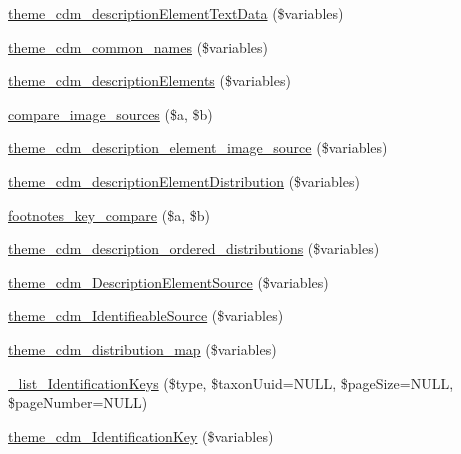 \begin{DoxyCompactItemize}
\item 
\hyperlink{cdm__dataportal_8descriptions_8theme_ac8dc91fcb4c8f1ba4503dae8034fc45e}{theme\-\_\-cdm\-\_\-description\-Element\-Text\-Data} (\$variables)
\item 
\hyperlink{cdm__dataportal_8descriptions_8theme_afee4cb1a5526e2af54aed8a9ebd41d41}{theme\-\_\-cdm\-\_\-common\-\_\-names} (\$variables)
\item 
\hyperlink{cdm__dataportal_8descriptions_8theme_afd1fddb74fcfe3ddff7928fbfa182dab}{theme\-\_\-cdm\-\_\-description\-Elements} (\$variables)
\item 
\hyperlink{cdm__dataportal_8descriptions_8theme_a240e3e12531ae51f9ccd831655d5df98}{compare\-\_\-image\-\_\-sources} (\$a, \$b)
\item 
\hyperlink{cdm__dataportal_8descriptions_8theme_a9ddae3b1d9be31f9245228d67fe4a56f}{theme\-\_\-cdm\-\_\-description\-\_\-element\-\_\-image\-\_\-source} (\$variables)
\item 
\hyperlink{cdm__dataportal_8descriptions_8theme_a2c76ce798eb769d6a41f0eff22d1aa35}{theme\-\_\-cdm\-\_\-description\-Element\-Distribution} (\$variables)
\item 
\hyperlink{cdm__dataportal_8descriptions_8theme_a73b951aa99c676f2e374c2606b9458cb}{footnotes\-\_\-key\-\_\-compare} (\$a, \$b)
\item 
\hyperlink{cdm__dataportal_8descriptions_8theme_a74a82ee79abd0b6971a8af38b563649e}{theme\-\_\-cdm\-\_\-description\-\_\-ordered\-\_\-distributions} (\$variables)
\item 
\hyperlink{cdm__dataportal_8descriptions_8theme_a5bb3aa06d98c624574adfa2253a7f85a}{theme\-\_\-cdm\-\_\-\-Description\-Element\-Source} (\$variables)
\item 
\hyperlink{cdm__dataportal_8descriptions_8theme_a6df1917c4684c7f29d12e57726e1552b}{theme\-\_\-cdm\-\_\-\-Identifieable\-Source} (\$variables)
\item 
\hyperlink{cdm__dataportal_8descriptions_8theme_ad7d21337f2ad9dac138223e08d450de4}{theme\-\_\-cdm\-\_\-distribution\-\_\-map} (\$variables)
\item 
\hyperlink{cdm__dataportal_8descriptions_8theme_a4c8a82afced58ed04290b2542c5d0e5d}{\-\_\-list\-\_\-\-Identification\-Keys} (\$type, \$taxon\-Uuid=N\-U\-L\-L, \$page\-Size=N\-U\-L\-L, \$page\-Number=N\-U\-L\-L)
\item 
\hyperlink{cdm__dataportal_8descriptions_8theme_adc7a1f7b72e12e385caf5e5c5d72bd92}{theme\-\_\-cdm\-\_\-\-Identification\-Key} (\$variables)
\item 

\end{DoxyCompactItemize}
